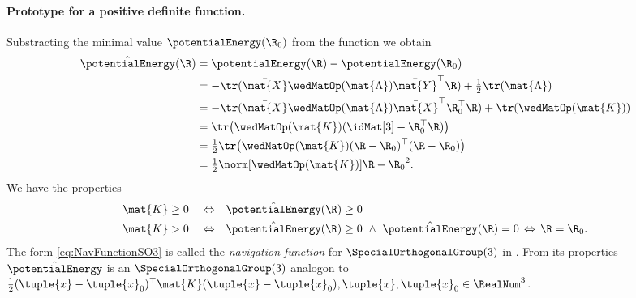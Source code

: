 \paragraph{Prototype for a positive definite function.}
Substracting the minimal value $\potentialEnergy(\R_0)$ from the function we obtain
\begin{subequations}
\begin{align}
 \hat{\potentialEnergy}(\R) &= \potentialEnergy(\R) - \potentialEnergy(\R_0)
\nonumber\\
 &= -\tr(\bar{\mat{X}} \wedMatOp(\mat{\Lambda}) \bar{\mat{Y}}^\top \R) + \tfrac{1}{2}\tr(\mat{\Lambda})
\nonumber\\
 &= -\tr(\bar{\mat{X}} \wedMatOp(\mat{\Lambda}) \bar{\mat{X}}^\top \R_0^\top \R) + \tr(\wedMatOp(\mat{K}))
\nonumber\\
\label{eq:NavFunctionSO3}
 &= \tr\big(\wedMatOp(\mat{K})(\idMat[3] - \R_0^\top \R)\big)
\\
 &= \tfrac{1}{2} \tr\big(\wedMatOp(\mat{K})(\R - \R_0)^\top (\R - \R_0)\big)
\nonumber\\
 &= \tfrac{1}{2}\norm[\wedMatOp(\mat{K})]{\R-\R_0}^2.
\end{align}
\end{subequations}
We have the properties
\begin{subequations}
\begin{align}
 \mat{K} &\geq 0& 
 &\Leftrightarrow&
 \hat{\potentialEnergy}(\R) &\geq 0
\\
 \mat{K} &> 0& 
 &\Leftrightarrow&
 \hat{\potentialEnergy}(\R) &\geq 0 \ \wedge \ \hat{\potentialEnergy}(\R) = 0 \, \Leftrightarrow \, \R = \R_0.
\end{align}
\end{subequations}
The form \eqref{eq:NavFunctionSO3} is called the \textit{navigation function} for $\SpecialOrthogonalGroup(3)$ in \cite{Koditschek:TotalEnergy}.
From its properties $\hat{\potentialEnergy}$ is an $\SpecialOrthogonalGroup(3)$ analogon to $\tfrac{1}{2}(\tuple{x}-\tuple{x}_0)^\top\mat{K}(\tuple{x}-\tuple{x}_0), \tuple{x},\tuple{x}_0\in\RealNum^3$.
